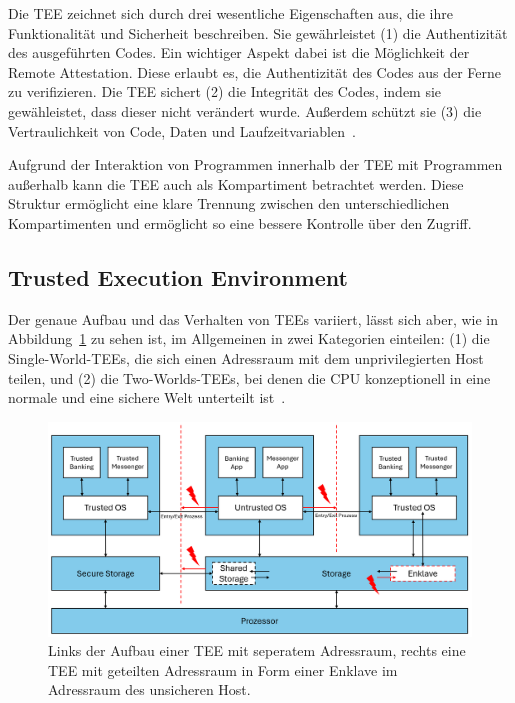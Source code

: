 Die TEE zeichnet sich durch drei wesentliche Eigenschaften aus, die ihre Funktionalität und Sicherheit beschreiben. 
Sie gewährleistet (1) die Authentizität des ausgeführten Codes.
Ein wichtiger Aspekt dabei ist die Möglichkeit der Remote Attestation. Diese erlaubt es, die Authentizität des Codes aus der Ferne zu verifizieren. 
Die TEE sichert (2) die Integrität des Codes, indem sie gewähleistet, dass dieser nicht verändert wurde. Außerdem schützt sie (3) die Vertraulichkeit von Code, Daten und Laufzeitvariablen~\cite{Trusted}.

Aufgrund der Interaktion von Programmen innerhalb der TEE mit Programmen außerhalb kann die TEE auch als Kompartiment betrachtet werden. Diese Struktur  ermöglicht eine klare Trennung zwischen den unterschiedlichen Kompartimenten und ermöglicht so eine bessere Kontrolle über den Zugriff.

\subsection{Trusted Execution Environment}
Der genaue Aufbau und das Verhalten von TEEs variiert, lässt sich aber, wie in Abbildung~\ref{fig:TEE} zu sehen ist, im Allgemeinen in zwei Kategorien einteilen: (1) die Single-World-TEEs, die sich einen Adressraum mit dem unprivilegierten Host teilen, und (2) die Two-Worlds-TEEs, bei denen die CPU konzeptionell in eine normale und eine sichere Welt unterteilt ist~\cite{TEEPaper}.

\begin{figure}[h]
    \centering
    \includegraphics[width=\linewidth]{Grafiken/TEE-Grafik.png}
    \caption{Links der Aufbau einer TEE mit seperatem Adressraum, rechts eine TEE mit geteilten Adressraum in Form einer Enklave im Adressraum des unsicheren Host.}
    \label{fig:TEE}
\end{figure}


